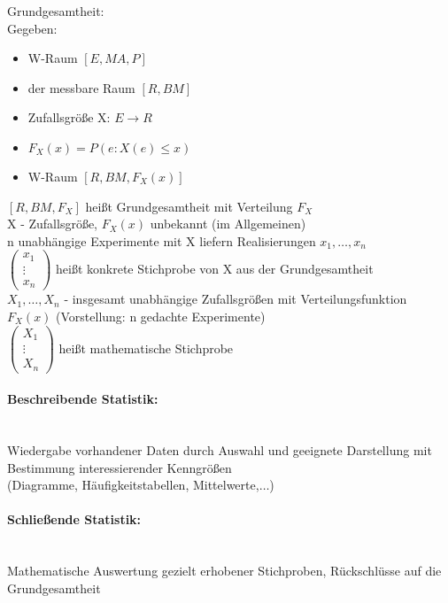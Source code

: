 \documentclass[a4paper,12pt]{scrartcl}
\begin{document}
Grundgesamtheit:\\
Gegeben: \begin{itemize}
          \item W-Raum $[E,MA,P]$
          \item der messbare Raum $[R,BM]$
          \item Zufallsgröße X: $E\rightarrow R$
          \item $F_X(x) = P(e:X(e)\leq x) $
          \item W-Raum $[R,BM,F_X(x)]$
         \end{itemize}
         
  $[R,BM,F_X]$ heißt Grundgesamtheit mit Verteilung $F_X$\\
  
  X - Zufallsgröße, $F_X(x)$ unbekannt (im Allgemeinen)\\
  n unabhängige Experimente mit X liefern Realisierungen $x_1,\dots,x_n$\\
  $\begin{pmatrix}
    x_1\\
    \vdots\\
    x_n
   \end{pmatrix}$ heißt konkrete Stichprobe von X aus der Grundgesamtheit\\
   $X_1,\dots,X_n$ - insgesamt unabhängige Zufallsgrößen mit Verteilungsfunktion $F_X(x)$ (Vorstellung: n gedachte Experimente)\\
   $\begin{pmatrix}
     X_1\\\vdots\\X_n
    \end{pmatrix}$ heißt mathematische Stichprobe\\
    \paragraph{Beschreibende Statistik:}\quad\\
    Wiedergabe vorhandener Daten durch Auswahl und geeignete Darstellung mit Bestimmung interessierender Kenngrößen\\
    (Diagramme, Häufigkeitstabellen, Mittelwerte,$\dots$)
    \paragraph{Schließende Statistik:}\quad\\
    Mathematische Auswertung gezielt erhobener Stichproben, Rückschlüsse auf die Grundgesamtheit\\
\end{document}
